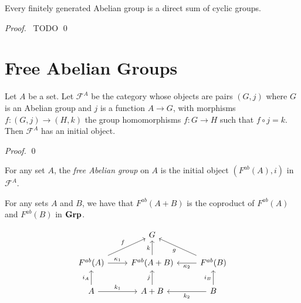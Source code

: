 \begin{thm}
Every finitely generated Abelian group is a direct sum of cyclic groups.
\end{thm}

\begin{proof}
\pf\ TODO \qed
\end{proof}

\section{Free Abelian Groups}

\begin{prop}
    Let $A$ be a set. Let $\mathcal{F}^A$ be the category whose objects are pairs $(G,j)$ where $G$ is an Abelian group and $j$ is a function $A \rightarrow G$, with morphisms $f : (G,j) \rightarrow (H,k)$ the group homomorphisms $f : G \rightarrow H$ such that $f \circ j = k$. Then $\mathcal{F}^A$ has an initial object.
\end{prop}

\begin{proof}
    \pf
    \qed
\end{proof}

\begin{df}
    For any set $A$, the \emph{free Abelian group} on $A$ is the initial object $(F^{ab}(A),i)$ in $\mathcal{F}^A$.
\end{df}

\begin{prop}
    For any sets $A$ and $B$, we have that $F^{ab}(A+B)$ is the coproduct of $F^{ab}(A)$ and $F^{ab}(B)$ in $\mathbf{Grp}$.
\end{prop}

\[ \begin{tikzcd}
        & G & \\
        F^{ab}(A) \arrow[r,"\kappa_1"] \arrow[ur,"f"] & F^{ab}(A+B) \arrow[u,"k"] & \arrow[l,"\kappa_2"] F^{ab}(B) \arrow[ul,"g"] \\
        A \arrow[r,"k_1"] \arrow[u,"i_A"] & A+B \arrow[u,"j"] & \arrow[l,"k_2"] \arrow[u,"i_B"] B
    \end{tikzcd} \]

